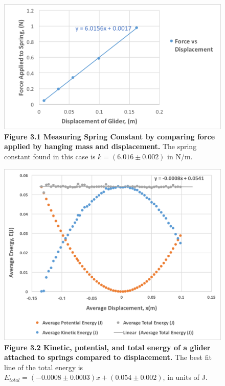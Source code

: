 \documentclass[11pt]{report}
\begin{document}
\begin{figure}[h!]
    \includegraphics[width=\linewidth]{SpringForce.png}
    \captionsetup{labelformat=empty}
    \caption{\textbf{Figure 3.1 Measuring Spring Constant by comparing force
    applied by hanging mass and displacement.} The spring constant found in this
case is \(k = (6.016 \pm 0.002)\) in N/m.}
\end{figure}

\begin{figure}[h!]
    \includegraphics[width=\linewidth]{Energy.png}
    \captionsetup[labelformat=empty]
    \caption{\textbf{Figure 3.2 Kinetic, potential, and total energy of a glider
    attached to springs compared to displacement.}  The best fit line of the
total energy is \(E_{total} = (-0.0008 \pm 0.0003)x + (0.054 \pm 0.002)\), in
units of J.}
\end{figure}
\end{document}
